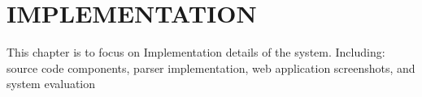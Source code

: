 %
%
%
%  
%

\chapter{\MakeUppercase{Implementation}}
\label{cha:implementation}

This chapter is to focus on Implementation details of the system. Including: source code components, parser implementation, web application screenshots, and system evaluation